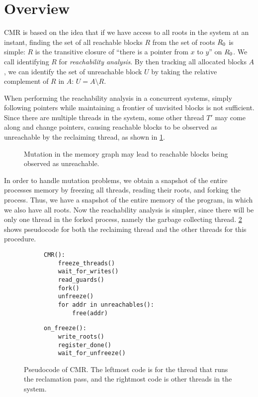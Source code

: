 \section{Overview\label{sec:cmr-overview}}

CMR is based on the idea that if we have access to all roots in the system at an instant, finding
the set of all reachable blocks $R$ from the set of roots $R\sb{0}$ is simple:
$R$ is the transitive closure of ``there is a pointer from $x$ to $y$'' on $R\sb{0}$.
We call identifying $R$ for \emph{reachability analysis}. By then tracking all allocated blocks
$A$, we can identify the set of unreachable block $U$ by taking the relative complement of $R$ in
$A$: $U = A \setminus R$.


When performing the reachability analysis in a concurrent systems, simply following pointers while
maintaining a frontier of unvisited blocks is not sufficient. Since there are multiple threads in
the system, some other thread $T'$ may come along and change pointers, causing reachable blocks to
be observed as unreachable by the reclaiming thread, as shown in \cref{fig:pointer-swap}.
 
\begin{figure}[ht]
  \centering
  
  \caption{Mutation in the memory graph may lead to reachable blocks being observed as
  unreachable.\label{fig:pointer-swap}}
\end{figure}

In order to handle mutation problems, we obtain a snapshot of the entire processes memory by
freezing all threads, reading their roots, and forking the process. Thus, we have a snapshot of
the entire memory of the program, in which we also have all roots. Now the reachability analysis is
simpler, since there will be only one thread in the forked process, namely the garbage collecting
thread. \cref{lst:cmr} shows pseudocode for both the reclaiming thread and the other threads
for this procedure.

\begin{figure}[ht]
  \begin{subfigure}{0.45\textwidth}
    \begin{lstlisting}
CMR():
    freeze_threads()
    wait_for_writes()
    read_guards()
    fork()
    unfreeze()
    for addr in unreachables():
        free(addr)\end{lstlisting}
  \end{subfigure}
  \hfill
  \begin{subfigure}{0.45\textwidth}
    \begin{lstlisting}
on_freeze():
    write_roots()
    register_done()
    wait_for_unfreeze()\end{lstlisting}
  \end{subfigure}
  \caption{Pseudocode of CMR\@. The leftmost code is for the thread that runs the reclamation pass,
  and the rightmost code is other threads in the system.\label{lst:cmr}}
\end{figure}


